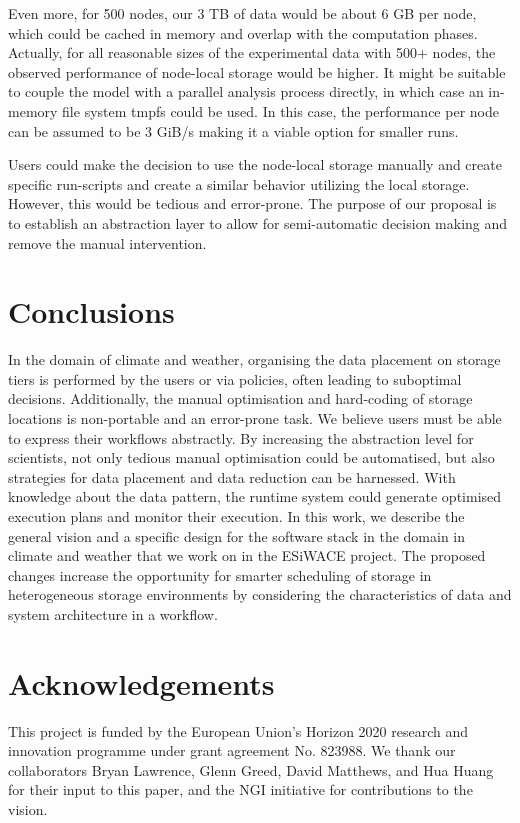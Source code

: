 \documentclass{superfri}
\begin{document}
Even more, for 500 nodes, our 3 TB of data would be about 6 GB per node, which could be cached in memory and overlap with the computation phases. Actually, for all reasonable sizes of the experimental data with 500+ nodes, the observed performance of node-local storage would be higher. It might be suitable to couple the model with a parallel analysis process directly, in which case an in-memory file system tmpfs could be used. In this case, the performance per node can be assumed to be 3 GiB/s making it a viable option for smaller runs.

Users could make the decision to use the node-local storage manually and create specific run-scripts and create a similar behavior utilizing the local storage. However, this would be tedious and error-prone. The purpose of our proposal is to establish an abstraction layer to allow for semi-automatic decision making and remove the manual intervention.


\section*{Conclusions}
\label{sec:conclusions}

In the domain of climate and weather, organising the data placement on storage tiers is performed by the users or via policies, often leading to suboptimal decisions.
Additionally, the manual optimisation and hard-coding of storage locations is non-portable and an error-prone task.
We believe users must be able to express their workflows abstractly.
By increasing the abstraction level for scientists, not only tedious manual optimisation could be automatised, but also strategies for data placement and data reduction can be harnessed.
With knowledge about the data pattern, the runtime system could generate optimised execution plans and monitor their execution.
In this work, we describe the general vision and a specific design for the software stack in the domain in climate and weather that we work on in the ESiWACE project.
The proposed changes increase the opportunity for smarter scheduling of storage in heterogeneous storage environments by considering the characteristics of data and system architecture in a workflow.

\section*{Acknowledgements}

\small
This project is funded by the European Union's Horizon 2020 research and innovation programme under grant agreement No. 823988.
We thank our collaborators Bryan Lawrence, Glenn Greed, David Matthews, and Hua Huang for their input to this paper, and the NGI initiative for contributions to the vision.

\openaccess


\end{document}
